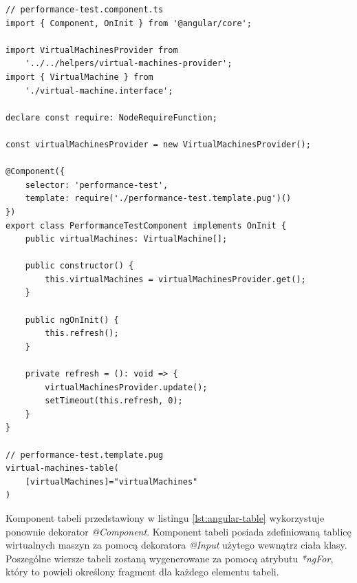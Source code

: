 \documentclass[polish, twoside, 12pt]{mwart}
\begin{document}
\begin{lstlisting}[caption=Główny komponent, label={lst:angular-main-component}]
// performance-test.component.ts
import { Component, OnInit } from '@angular/core';

import VirtualMachinesProvider from
    '../../helpers/virtual-machines-provider';
import { VirtualMachine } from
    './virtual-machine.interface';

declare const require: NodeRequireFunction;

const virtualMachinesProvider = new VirtualMachinesProvider();

@Component({
    selector: 'performance-test',
    template: require('./performance-test.template.pug')()
})
export class PerformanceTestComponent implements OnInit {
    public virtualMachines: VirtualMachine[];

    public constructor() {
        this.virtualMachines = virtualMachinesProvider.get();
    }

    public ngOnInit() {
        this.refresh();
    }

    private refresh = (): void => {
        virtualMachinesProvider.update();
        setTimeout(this.refresh, 0);
    }
}

// performance-test.template.pug
virtual-machines-table(
    [virtualMachines]="virtualMachines"
)
\end{lstlisting}

Komponent tabeli przedstawiony w listingu \ref{lst:angular-table} wykorzystuje ponownie dekorator \emph{@Component}. Komponent tabeli posiada zdefiniowaną tablicę wirtualnych maszyn za pomocą dekoratora \emph{@Input} użytego wewnątrz ciała klasy. Poszególne wiersze tabeli zostaną wygenerowane za pomocą atrybutu \emph{*ngFor}, który to powieli określony fragment dla każdego elementu tabeli.
\end{document}
